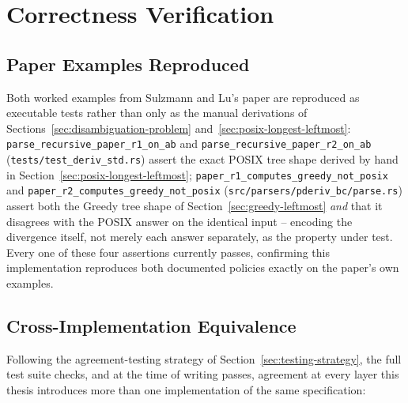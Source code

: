 \section{Correctness Verification}
\label{sec:correctness-verification}

\subsection{Paper Examples Reproduced}
\label{sec:paper-examples-reproduced}

Both worked examples from Sulzmann and Lu's paper are reproduced as
executable tests rather than only as the manual derivations of
Sections~\ref{sec:disambiguation-problem} and~\ref{sec:posix-longest-leftmost}:
\texttt{parse\_recursive\_paper\_r1\_on\_ab} and
\texttt{parse\_recursive\_paper\_r2\_on\_ab}
(\texttt{tests/test\_deriv\_std.rs}) assert the exact POSIX tree shape
derived by hand in Section~\ref{sec:posix-longest-leftmost};
\texttt{paper\_r1\_computes\_greedy\_not\_posix} and
\texttt{paper\_r2\_computes\_greedy\_not\_posix}
(\texttt{src/parsers/pderiv\_bc/parse.rs}) assert both the Greedy tree
shape of Section~\ref{sec:greedy-leftmost} \emph{and} that it disagrees
with the POSIX answer on the identical input -- encoding the divergence
itself, not merely each answer separately, as the property under test.
Every one of these four assertions currently passes, confirming this
implementation reproduces both documented policies exactly on the
paper's own examples.

\subsection{Cross-Implementation Equivalence}
\label{sec:cross-implementation-equivalence}

Following the agreement-testing strategy of
Section~\ref{sec:testing-strategy}, the full test suite checks, and at
the time of writing passes, agreement at every layer this thesis
introduces more than one implementation of the same specification:

